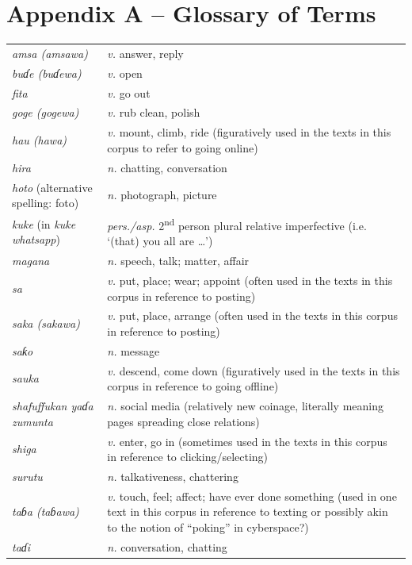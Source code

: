\documentclass[output=paper
,newtxmath
,modfonts
,nonflat]{langsci/langscibook}
\begin{document}
\section*{Appendix A – Glossary of  Terms}
\noindent
\begin{tabularx}{\textwidth}{p{3cm}Q}
\textit{amsa (amsawa)} & \textit{v.} answer, reply \\
\textit{buɗe (buɗewa)} & \textit{v.} open \\
\textit{fita} & \textit{v.} go out\\
\textit{goge (gogewa)} & \textit{v.} rub clean, polish\\
\textit{hau (hawa)} & \textit{v.} mount, climb, ride (figuratively used in the texts in this corpus to refer to going online) \\
\textit{hira} & \textit{n.} chatting, conversation\\
\textit{hoto} (alternative spelling: foto) & \textit{n.} photograph, picture\\
\textit{kuke} (in \textit{kuke whatsapp}) & \textit{pers./asp.} 2\textsuperscript{nd} person plural relative imperfective (i.e. ‘(that) you all are …’)\\
\textit{magana} & \textit{n.} speech, talk; matter, affair\\
\textit{sa} & \textit{v.} put, place; wear; appoint (often used in the texts in this corpus in reference to posting)\\
\textit{saka (sakawa)} & \textit{v.} put, place, arrange (often used in the texts in this corpus in reference to posting)\\
\textit{saƙo} & \textit{n.} message\\
\textit{sauka} & \textit{v.} descend, come down (figuratively used in the texts in this corpus in reference to going offline)\\
\textit{shafuffukan yaɗa zumunta} & \textit{n.} social media (relatively new coinage, literally meaning pages spreading close relations)\\
\textit{shiga} & \textit{v.} enter, go in (sometimes used in the texts in this corpus in reference to clicking/selecting)\\
\textit{surutu} & \textit{n.} talkativeness, chattering\\
\textit{taɓa (taɓawa)} & \textit{v.} touch, feel; affect; have ever done something (used in one text in this corpus in reference to texting or possibly akin to the notion of “poking” in cyberspace?) \\
\textit{taɗi} & \textit{n.} conversation, chatting\\

\end{tabularx}
\end{document}
